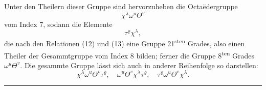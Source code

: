 Unter den Theilern dieser Gruppe sind hervorzuheben die
Octa\"edergruppe
\[
\chi^\lambda \omega^u \Theta^v
\]
vom Index 7, sodann die Elemente
\[
\tau^\varrho \chi^\lambda,
\]
die nach den Relationen (12) und (13) eine Gruppe 21\textsuperscript{sten} Grades,
also einen Theiler der Gesammtgruppe vom Index 8 bilden;
ferner die Gruppe 8\textsuperscript{ten} Grades $\omega^u \Theta^v$. Die gesammte Gruppe
lässt sich auch in anderer Reihenfolge so darstellen:
\[
\chi^\lambda \omega^u \Theta^v \tau^\varrho, \quad \omega^u \Theta^v \chi^\lambda \tau^\varrho, \quad \tau^\varrho \omega^u \Theta^v \chi^\lambda.
\]

\bigskip
\begin{center}
\rule{4cm}{0.4pt}
\end{center}

